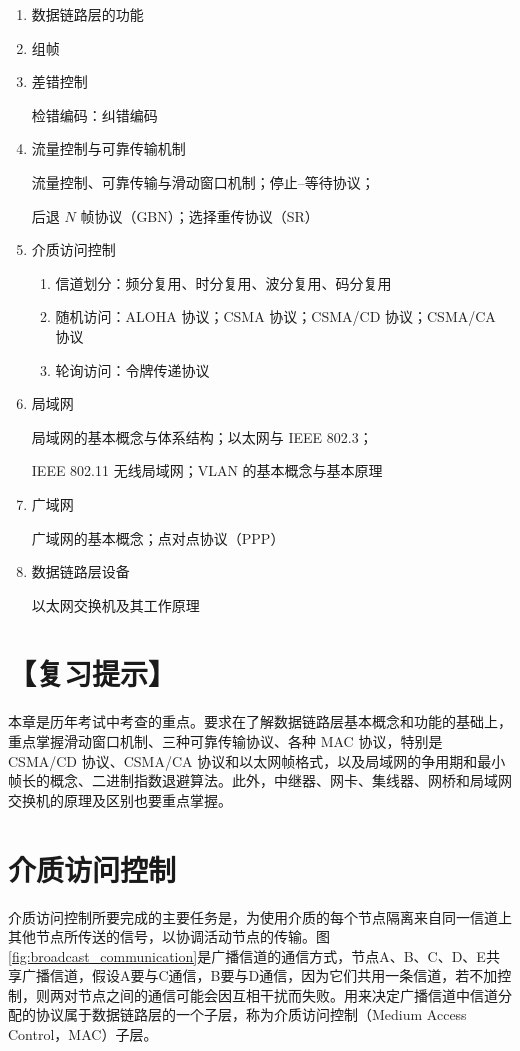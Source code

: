 \documentclass{ctexbook}
\begin{document}
	\begin{enumerate}
		\item 数据链路层的功能
		\item 组帧
		\item 差错控制
		
		
检错编码：纠错编码
		
		\item 流量控制与可靠传输机制
		
		
流量控制、可靠传输与滑动窗口机制；停止--等待协议；
		
后退 $N$ 帧协议（GBN）；选择重传协议（SR）
		
		\item 介质访问控制
		\begin{enumerate}
			\item 信道划分：频分复用、时分复用、波分复用、码分复用
			\item 随机访问：ALOHA 协议；CSMA 协议；CSMA/CD 协议；CSMA/CA 协议
			\item 轮询访问：令牌传递协议
		\end{enumerate}
		\item 局域网
		
		
局域网的基本概念与体系结构；以太网与 IEEE 802.3；
		
IEEE 802.11 无线局域网；VLAN 的基本概念与基本原理
		
		\item 广域网
		
		
广域网的基本概念；点对点协议（PPP）
		
		\item 数据链路层设备
		
		
以太网交换机及其工作原理
		
	\end{enumerate}
	
	\section*{【复习提示】}
	
	本章是历年考试中考查的重点。要求在了解数据链路层基本概念和功能的基础上，重点掌握滑动窗口机制、三种可靠传输协议、各种 MAC 协议，特别是 CSMA/CD 协议、CSMA/CA 协议和以太网帧格式，以及局域网的争用期和最小帧长的概念、二进制指数退避算法。此外，中继器、网卡、集线器、网桥和局域网交换机的原理及区别也要重点掌握。
	
		\section{介质访问控制}
	介质访问控制所要完成的主要任务是，为使用介质的每个节点隔离来自同一信道上其他节点所传送的信号，以协调活动节点的传输。图\ref{fig:broadcast_communication}是广播信道的通信方式，节点A、B、C、D、E共享广播信道，假设A要与C通信，B要与D通信，因为它们共用一条信道，若不加控制，则两对节点之间的通信可能会因互相干扰而失败。用来决定广播信道中信道分配的协议属于数据链路层的一个子层，称为介质访问控制（Medium Access Control，MAC）子层。
	
\end{document}
